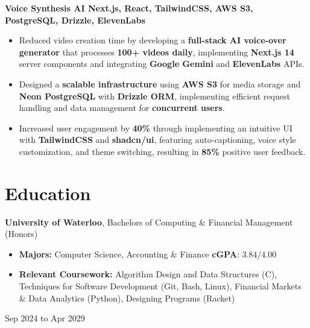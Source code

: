 \documentclass[10pt, letterpaper]{article}
\newenvironment{highlights}{
    \begin{itemize}[
        topsep=0.10 cm,
        parsep=0.10 cm,
        partopsep=0pt,
        itemsep=0pt,
        leftmargin=0.4 cm + 10pt
    ]
}{
    \end{itemize}
} %
\newenvironment{twocolentry}[2][]{
    \onecolentry
    \def\secondColumn{#2}
    \setcolumnwidth{\fill, 2.5 cm}
    \begin{paracol}{2}
}{
    \switchcolumn \raggedleft \secondColumn
    \end{paracol}
    \endonecolentry
} %
\newenvironment{threecolentry}[3][]{
    \onecolentry
    \def\thirdColumn{#3}
    \setcolumnwidth{1 cm, \fill, 2.5 cm}
    \begin{paracol}{3}
    {\raggedright #2} \switchcolumn
}{
    \switchcolumn \raggedleft \thirdColumn
    \end{paracol}
    \endonecolentry
} %
\let\hrefWithoutArrow\href
\renewcommand{\href}[2]{\hrefWithoutArrow{#1}{\ifthenelse{\equal{#2}{}}{ }{#2 }\raisebox{.15ex}{\footnotesize \faExternalLink*}}}
\begin{document}
        \vspace{0.05 cm}

        \begin{twocolentry}{
            \href{https://github.com/akramj13/voice-synthesis-ai}{GitHub Link}
        }
            \textbf{Voice Synthesis AI \hfill Next.js, React, TailwindCSS, AWS S3, PostgreSQL, Drizzle, ElevenLabs}
            \begin{highlights}
                \item Reduced video creation time by developing a \textbf{full-stack AI voice-over generator} that processes \textbf{100+ videos daily}, implementing \textbf{Next.js 14} server components and integrating \textbf{Google Gemini} and \textbf{ElevenLabs} APIs.
                \item Designed a \textbf{scalable infrastructure} using \textbf{AWS S3} for media storage and \textbf{Neon PostgreSQL} with \textbf{Drizzle ORM}, implementing efficient request handling and data management for \textbf{concurrent users}.
                \item Increased user engagement by \textbf{40\%} through implementing an intuitive UI with \textbf{TailwindCSS} and \textbf{shadcn/ui}, featuring auto-captioning, voice style customization, and theme switching, resulting in \textbf{85\%} positive user feedback.
            \end{highlights}
        \end{twocolentry}



    
    \section{Education}



        
        \begin{threecolentry}{\textbf{}}{
            Sep 2024 to Apr 2029
        }
            \textbf{University of Waterloo}, Bachelors of Computing \& Financial Management (Honors)
            \begin{highlights}
                \item \textbf{Majors:} Computer Science, Accounting \& Finance \hfill \textbf{cGPA}: 3.84/4.00
                \item \textbf{Relevant Coursework:} Algorithm Design and Data Structures (C), Techniques for Software Development (Git, Bash, Linux), Financial Markets \& Data Analytics (Python), Designing Programs (Racket)
            \end{highlights}
        \end{threecolentry}


    
\end{document}
